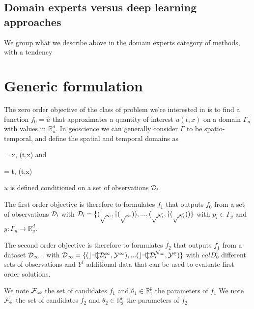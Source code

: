 \begin{bibunit}
\subsection{Domain experts versus deep learning approaches}
  We group what we describe above in the domain experts category of methods, with a tendency 




\section{Generic formulation}

  The zero order objective of the class of problem we're interested in is to find a function $f_0=\hat{u}$  that approximates a quantity of interest $u(t, x)$ on a domain $\Gamma_u$ with values in $\mathbb{R}^d_u$. 
  In geoscience we can generally consider $\Gamma$ to be spatio-temporal, and define the spatial and temporal domains  as {\Omega = {x, (t,x) \in \Gamma} and {\Tau = {t, (t,x) \in \Gamma}

   $u$ is defined 
  conditioned on a set of observations $\cal{D}_0$.

  The first order objective is therefore to formulates $f_1$ that outputs $f_0$ from  a set of observations $\cal{D}_0$
  with $\cal{D}_0 = \{(p_1, y(p_1)), ..., (p_{N_0}, y(p_{N_0})) \}$ with  $p_i \in \Gamma_y$ and $y: \Gamma_y \to \mathbb{R}^d_y$.

  The second order objective is therefore to formulates $f_2$ that outputs $f_1$ from a dataset $\cal{D}_1$ .
  with $\cal{D}_1 = \{(cal{D}_0^1, Y^1),... (cal{D}_0^{N_1}, Y^2) \}$ with  $cal{D}_0^{i}$ different sets of observations and $Y^i$ additional data that can be used to evaluate first order solutions.

  We note $\cal{F}_1$  the set of candidates $f_1$ and $\theta_1 \in \mathbb{R}^p_1$ the parameters of $f_1$
  We note $\cal{F}_2$  the set of candidates $f_2$ and $\theta_2 \in \mathbb{R}^p_2$ the parameters of $f_2$



}}
\end{bibunit}
